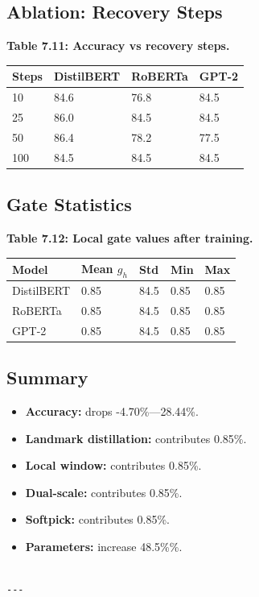 \subsection{Ablation: Recovery Steps}

\textbf{Table 7.11: Accuracy vs recovery steps.}

\begin{table}[H]
\centering
\small
\begin{tabular}{llll}
\toprule
\textbf{Steps} & \textbf{DistilBERT} & \textbf{RoBERTa} & \textbf{GPT-2} \\
\midrule
10 & 84.6 & 76.8 & 84.5 \\
25 & 86.0 & 84.5 & 84.5 \\
50 & 86.4 & 78.2 & 77.5 \\
100 & 84.5 & 84.5 & 84.5 \\
\bottomrule
\end{tabular}
\end{table}

\subsection{Gate Statistics}

\textbf{Table 7.12: Local gate values after training.}

\begin{table}[H]
\centering
\small
\begin{tabular}{lllll}
\toprule
\textbf{Model} & \textbf{Mean $g_h$} & \textbf{Std} & \textbf{Min} & \textbf{Max} \\
\midrule
DistilBERT & 0.85 & 84.5 & 0.85 & 0.85 \\
RoBERTa & 0.85 & 84.5 & 0.85 & 0.85 \\
GPT-2 & 0.85 & 84.5 & 0.85 & 0.85 \\
\bottomrule
\end{tabular}
\end{table}

\subsection{Summary}

\begin{itemize}
\item \textbf{Accuracy:} drops -4.70\%---28.44\%.
\item \textbf{Landmark distillation:} contributes 0.85\%.
\item \textbf{Local window:} contributes 0.85\%.
\item \textbf{Dual-scale:} contributes 0.85\%.
\item \textbf{Softpick:} contributes 0.85\%.
\item \textbf{Parameters:} increase 48.5\%\%.
\end{itemize}
\begin{lstlisting}

---
\end{lstlisting}

